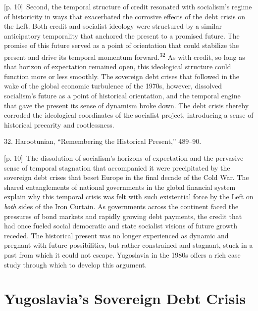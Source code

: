 \documentclass[10pt,a4paper]{article}
\begin{document}
{\scriptsize\color{gray} [p. 10]}\ Second, the temporal structure of credit resonated with socialism’s regime of historicity in ways that exacerbated the corrosive effects of the debt crisis on the Left. Both credit and socialist ideology were structured by a similar anticipatory temporality that anchored the present to a promised future. The promise of this future served as a point of orientation that could stabilize the present and drive its temporal momentum forward.\nobreak\textsuperscript{32} As with credit, so long as that horizon of expectation remained open, this ideological structure could function more or less smoothly. The sovereign debt crises that followed in the wake of the global economic turbulence of the 1970s, however, dissolved socialism’s future as a point of historical orientation, and the temporal engine that gave the present its sense of dynamism broke down. The debt crisis thereby corroded the ideological coordinates of the socialist project, introducing a sense of historical precarity and rootlessness.\par{\small 32. Harootunian, “Remembering the Historical Present,” 489–90.\par}
{\scriptsize\color{gray} [p. 10]}\ The dissolution of socialism’s horizons of expectation and the pervasive sense of temporal stagnation that accompanied it were precipitated by the sovereign debt crises that beset Europe in the final decade of the Cold War. The shared entanglements of national governments in the global financial system explain why this temporal crisis was felt with such existential force by the Left on \textit{both} sides of the Iron Curtain. As governments across the continent faced the pressures of bond markets and rapidly growing debt payments, the credit that had once fueled social democratic and state socialist visions of future growth receded. The historical present was no longer experienced as dynamic and pregnant with future possibilities, but rather constrained and stagnant, stuck in a past from which it could not escape. Yugoslavia in the 1980s offers a rich case study through which to develop this argument.\par
{}\section*{Yugoslavia’s Sovereign Debt Crisis}
\end{document}

